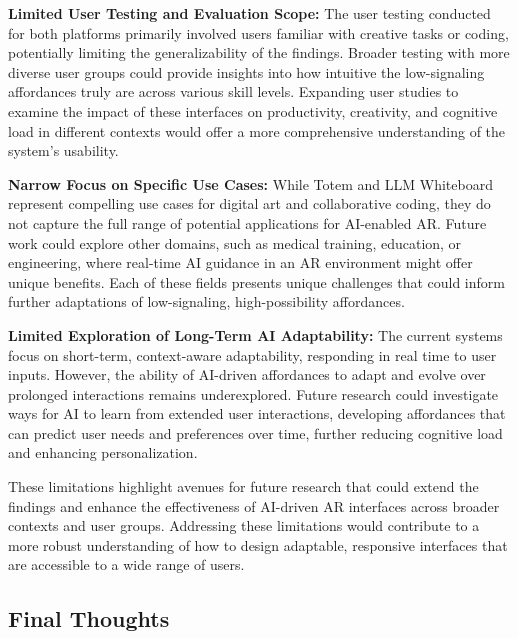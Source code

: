 \textbf{Limited User Testing and Evaluation Scope:}
The user testing conducted for both platforms primarily involved users familiar with creative tasks or coding, potentially limiting the generalizability of the findings.
Broader testing with more diverse user groups could provide insights into how intuitive the low-signaling affordances truly are across various skill levels.
Expanding user studies to examine the impact of these interfaces on productivity, creativity, and cognitive load in different contexts would offer a more comprehensive understanding of the system’s usability.

\textbf{Narrow Focus on Specific Use Cases:}
While Totem and LLM Whiteboard represent compelling use cases for digital art and collaborative coding, they do not capture the full range of potential applications for AI-enabled AR.
Future work could explore other domains, such as medical training, education, or engineering, where real-time AI guidance in an AR environment might offer unique benefits.
Each of these fields presents unique challenges that could inform further adaptations of low-signaling, high-possibility affordances.

\textbf{Limited Exploration of Long-Term AI Adaptability:}
The current systems focus on short-term, context-aware adaptability, responding in real time to user inputs.
However, the ability of AI-driven affordances to adapt and evolve over prolonged interactions remains underexplored.
Future research could investigate ways for AI to learn from extended user interactions, developing affordances that can predict user needs and preferences over time, further reducing cognitive load and enhancing personalization.

These limitations highlight avenues for future research that could extend the findings and enhance the effectiveness of AI-driven AR interfaces across broader contexts and user groups.
Addressing these limitations would contribute to a more robust understanding of how to design adaptable, responsive interfaces that are accessible to a wide range of users.

\subsection{Final Thoughts}


